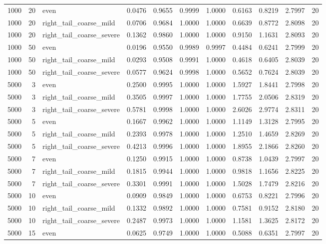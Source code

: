 \begin{table}[!h]
{\begin{tabular}[t]{rrlrrrrrrrr}
1000 & 20 & even & 0.0476 & 0.9655 & 0.9999 & 1.0000 & 0.6163 & 0.8219 & 2.7997 & 20\\
1000 & 20 & right\_tail\_coarse\_mild & 0.0706 & 0.9684 & 1.0000 & 1.0000 & 0.6639 & 0.8772 & 2.8098 & 20\\
1000 & 20 & right\_tail\_coarse\_severe & 0.1362 & 0.9860 & 1.0000 & 1.0000 & 0.9150 & 1.1631 & 2.8093 & 20\\
1000 & 50 & even & 0.0196 & 0.9550 & 0.9989 & 0.9997 & 0.4484 & 0.6241 & 2.7999 & 20\\
1000 & 50 & right\_tail\_coarse\_mild & 0.0293 & 0.9508 & 0.9991 & 1.0000 & 0.4618 & 0.6405 & 2.8039 & 20\\
1000 & 50 & right\_tail\_coarse\_severe & 0.0577 & 0.9624 & 0.9998 & 1.0000 & 0.5652 & 0.7624 & 2.8039 & 20\\
5000 & 3 & even & 0.2500 & 0.9995 & 1.0000 & 1.0000 & 1.5927 & 1.8441 & 2.7998 & 20\\
5000 & 3 & right\_tail\_coarse\_mild & 0.3505 & 0.9997 & 1.0000 & 1.0000 & 1.7755 & 2.0506 & 2.8319 & 20\\
5000 & 3 & right\_tail\_coarse\_severe & 0.5781 & 0.9998 & 1.0000 & 1.0000 & 2.6026 & 2.9774 & 2.8311 & 20\\
5000 & 5 & even & 0.1667 & 0.9962 & 1.0000 & 1.0000 & 1.1149 & 1.3128 & 2.7995 & 20\\
5000 & 5 & right\_tail\_coarse\_mild & 0.2393 & 0.9978 & 1.0000 & 1.0000 & 1.2510 & 1.4659 & 2.8269 & 20\\
5000 & 5 & right\_tail\_coarse\_severe & 0.4213 & 0.9996 & 1.0000 & 1.0000 & 1.8955 & 2.1866 & 2.8260 & 20\\
5000 & 7 & even & 0.1250 & 0.9915 & 1.0000 & 1.0000 & 0.8738 & 1.0439 & 2.7997 & 20\\
5000 & 7 & right\_tail\_coarse\_mild & 0.1815 & 0.9944 & 1.0000 & 1.0000 & 0.9818 & 1.1656 & 2.8225 & 20\\
5000 & 7 & right\_tail\_coarse\_severe & 0.3301 & 0.9991 & 1.0000 & 1.0000 & 1.5028 & 1.7479 & 2.8216 & 20\\
5000 & 10 & even & 0.0909 & 0.9849 & 1.0000 & 1.0000 & 0.6753 & 0.8221 & 2.7996 & 20\\
5000 & 10 & right\_tail\_coarse\_mild & 0.1332 & 0.9892 & 1.0000 & 1.0000 & 0.7581 & 0.9152 & 2.8180 & 20\\
5000 & 10 & right\_tail\_coarse\_severe & 0.2487 & 0.9973 & 1.0000 & 1.0000 & 1.1581 & 1.3625 & 2.8172 & 20\\
5000 & 15 & even & 0.0625 & 0.9749 & 1.0000 & 1.0000 & 0.5088 & 0.6351 & 2.7997 & 20\\

\end{tabular}}
\end{table}

